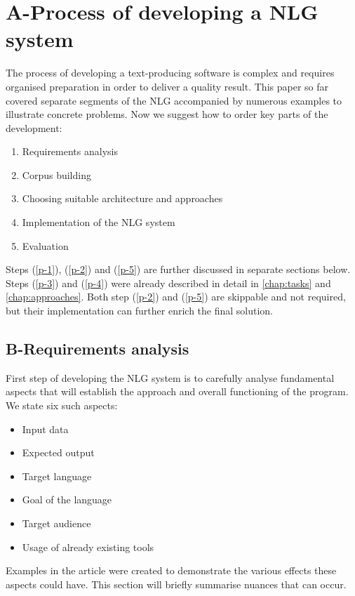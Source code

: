 \chapter{A-Process of developing a NLG system}\label{chap:requirements}

The process of developing a text-producing software is complex and requires organised preparation in order to deliver a quality result. This paper so far covered separate segments of the NLG accompanied by numerous examples to illustrate concrete problems. Now we suggest how to order key parts of the development:
\begin{enumerate}
	\item Requirements analysis \label{p-1}
	\item Corpus building \label{p-2}
	\item Choosing suitable architecture and approaches \label{p-3}
	\item Implementation of the NLG system \label{p-4}
	\item Evaluation \label{p-5}
\end{enumerate}

Steps (\ref{p-1}), (\ref{p-2}) and (\ref{p-5}) are further discussed in separate sections below. Steps (\ref{p-3}) and (\ref{p-4}) were already described in detail in \autoref{chap:tasks} and \autoref{chap:approaches}. Both step (\ref{p-2}) and (\ref{p-5}) are skippable and not required, but their implementation can further enrich the final solution.

\section{B-Requirements analysis}

First step of developing the NLG system is to carefully analyse fundamental aspects that will establish the approach and overall functioning of the program. We state six such aspects:
\begin{itemize}
	\item Input data
	\item Expected output
	\item Target language
	\item Goal of the language 
	\item Target audience
	\item Usage of already existing tools  
\end{itemize}

Examples in the article were created to demonstrate the various effects these aspects could have. This section will briefly summarise nuances that can occur. 

